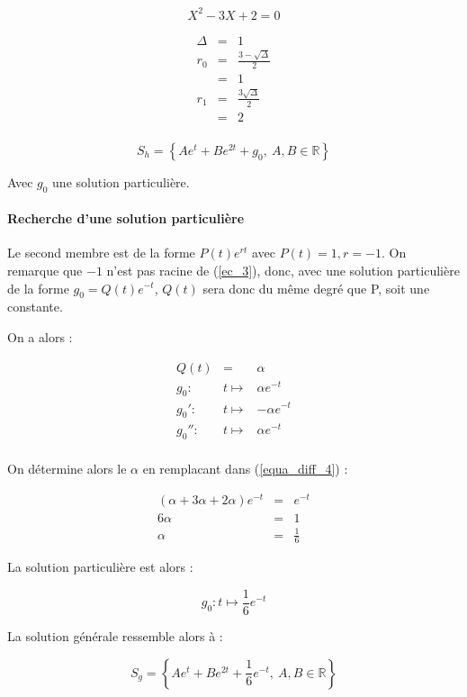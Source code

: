 \documentclass[a4paper, 11pt]{report} %
\newcommand{\R}{\mathbb{R}}
\renewcommand{\mapsto}{\longmapsto}
\begin{document}
\begin{equation}
X^2  -3X + 2 = 0
\label{ec_3}
\end{equation}

\begin{eqnarray*}
    \Delta & = & 1\\
    r_0 & = & \frac{3-\sqrt{\Delta}}{2}\\
    & = & 1\\
    r_1 & = & \frac{3\sqrt{\Delta}}{2}\\
    & = & 2\\
\end{eqnarray*}

\[
S_h = \left\{Ae^{t} + Be^{2t} + g_0,~A,B\in\R\right\}
\]

Avec $g_0$ une solution particulière.

\paragraph{Recherche d'une solution particulière}

Le second membre est de la forme $P(t)e^{rt}$ avec $P(t)=1, r = -1$. On remarque que $-1$ n'est pas racine de
(\ref{ec_3}), donc, avec une solution particulière de la forme $g_0=Q(t)e^{-t}$, $Q(t)$ sera donc du même degré que P,
soit une constante.

On a alors :

\begin{eqnarray*}
Q(t) & = & \alpha\\
g_0 : & t \mapsto & \alpha e^{-t}\\
g_0' : & t \mapsto & -\alpha e^{-t}\\
g_0'' : & t \mapsto & \alpha e^{-t}\\
\end{eqnarray*}

On détermine alors le $\alpha$ en remplacant dans (\ref{equa_diff_4}) :

\begin{eqnarray*}
(\alpha +3\alpha+2\alpha)e^{-t} & = & e^{-t}\\
6\alpha & = & 1\\
\alpha & = & \frac{1}{6}
\end{eqnarray*}

La solution particulière est alors :

\[g_0 : t \mapsto \frac{1}{6}e^{-t}\]

La solution générale ressemble alors à :

\[
S_g = \left\{Ae^{t} + Be^{2t} + \frac{1}{6}e^{-t},~A,B\in\R\right\}
\]
\end{document}
